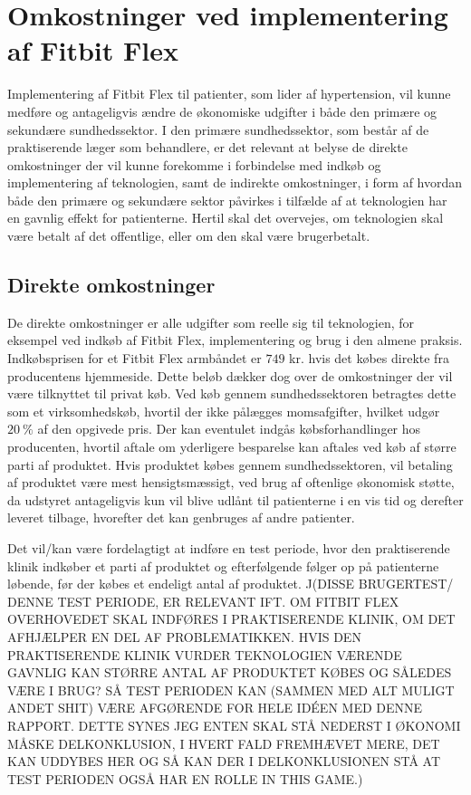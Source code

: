 
\section{Omkostninger ved implementering af Fitbit Flex}


Implementering af Fitbit Flex til patienter, som lider af hypertension, vil kunne medføre og antageligvis ændre de økonomiske udgifter i både den primære og sekundære sundhedssektor. I den primære sundhedssektor, som består af de praktiserende læger som behandlere, er det relevant at belyse de direkte omkostninger der vil kunne forekomme i forbindelse med indkøb og implementering af teknologien, samt de indirekte omkostninger, i form af hvordan både den primære og sekundære sektor påvirkes i tilfælde af at teknologien har en gavnlig effekt for patienterne. Hertil skal det overvejes, om teknologien skal være betalt af det offentlige, eller om den skal være brugerbetalt. 

\subsection{Direkte omkostninger}
De direkte omkostninger er alle  udgifter som reelle sig til teknologien, for eksempel ved indkøb af Fitbit Flex, implementering og brug i den almene praksis.  
Indkøbsprisen for et Fitbit Flex armbåndet er $749$ kr. hvis det købes direkte fra producentens hjemmeside. Dette beløb dækker dog over de omkostninger der vil være tilknyttet til privat køb. 
Ved køb gennem sundhedssektoren betragtes dette som et virksomhedskøb, hvortil der ikke pålægges momsafgifter, hvilket udgør $20~\%$ af den opgivede pris. 
Der kan eventulet indgås købsforhandlinger hos producenten, hvortil aftale om yderligere besparelse kan aftales ved køb af større parti af produktet. Hvis produktet købes gennem sundhedssektoren, vil betaling af produktet være mest hensigtsmæssigt, ved brug af oftenlige økonomisk støtte, da udstyret antageligvis kun vil blive udlånt til patienterne i en vis tid og derefter leveret tilbage, hvorefter det kan genbruges af andre patienter. 


Det vil/kan være fordelagtigt at indføre en test periode, hvor den praktiserende klinik indkøber et parti af produktet og efterfølgende følger op på patienterne løbende, før der købes et endeligt antal af produktet. 
                ^^
(DISSE BRUGERTEST/ DENNE TEST PERIODE, ER RELEVANT IFT. OM FITBIT FLEX OVERHOVEDET SKAL INDFØRES I PRAKTISERENDE KLINIK, OM DET AFHJÆLPER EN DEL AF PROBLEMATIKKEN. HVIS DEN PRAKTISERENDE KLINIK VURDER TEKNOLOGIEN VÆRENDE GAVNLIG KAN STØRRE ANTAL AF PRODUKTET KØBES OG SÅLEDES VÆRE I BRUG? SÅ TEST PERIODEN KAN (SAMMEN MED ALT MULIGT ANDET SHIT) VÆRE AFGØRENDE FOR HELE IDÉEN MED DENNE RAPPORT. DETTE SYNES JEG ENTEN SKAL STÅ NEDERST I ØKONOMI MÅSKE DELKONKLUSION, I HVERT FALD FREMHÆVET MERE, DET KAN UDDYBES HER OG SÅ KAN DER I DELKONKLUSIONEN STÅ AT TEST PERIODEN OGSÅ HAR EN ROLLE IN THIS GAME.)


